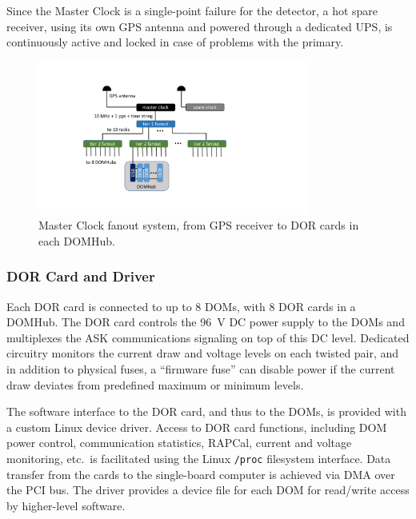 Since the Master Clock is a single-point failure for the detector, a
hot spare receiver, using its own GPS antenna and powered through a
dedicated UPS, is continuously active and locked in case of problems with
the primary.

\begin{figure}[!ht]
 \centering
 \includegraphics[width=0.8\textwidth]{graphics/online/data_readout/clock_fanout.pdf}
 \caption{Master Clock fanout system, from GPS receiver to DOR cards in
   each DOMHub.}
 \label{fig:clock_fanout}
\end{figure}


\subsubsection{DOR Card and Driver}

Each DOR card is connected to up to 8 DOMs, with 8 DOR cards in a
DOMHub. The DOR card controls the 96~V DC power supply to the DOMs and
multiplexes the ASK communications signaling on top of this DC level.
Dedicated circuitry monitors the current draw and voltage levels on each
twisted pair, and in addition to physical fuses, a ``firmware fuse'' can
disable power if the current draw deviates from predefined maximum or
minimum levels.

The software interface to the DOR card, and thus to the DOMs, is provided
with a custom Linux device driver.  Access to DOR card functions, including
DOM power control, communication statistics, RAPCal, current and voltage
monitoring, etc.~is facilitated using the Linux \texttt{/proc} filesystem
interface.  Data transfer from the cards to the single-board computer is
achieved via DMA over the PCI bus.  The driver provides a device file for
each DOM for read/write access by higher-level software.

